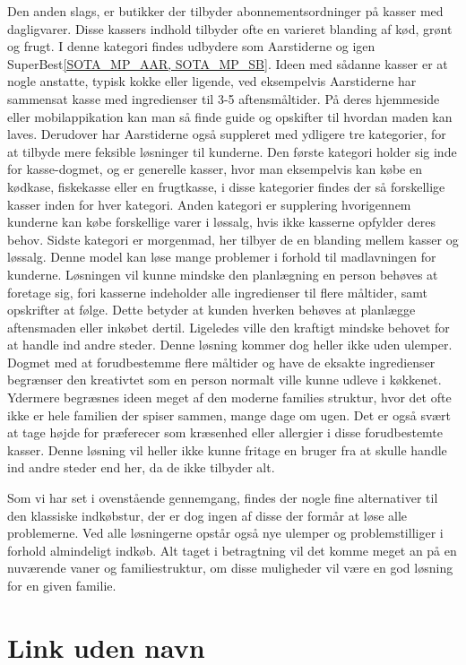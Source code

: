 Den anden slags, er butikker der tilbyder abonnementsordninger på kasser med dagligvarer.
Disse kassers indhold tilbyder ofte en varieret blanding af kød, grønt og frugt.
I denne kategori findes udbydere som Aarstiderne og igen SuperBest\ref{SOTA_MP_AAR, SOTA_MP_SB}.
Ideen med sådanne kasser er at nogle anstatte, typisk kokke eller ligende, ved eksempelvis Aarstiderne har sammensat kasse med ingredienser til 3-5 aftensmåltider.
På deres hjemmeside eller mobilappikation kan man så finde guide og opskifter til hvordan maden kan laves.
Derudover har Aarstiderne også suppleret med ydligere tre kategorier, for at tilbyde mere feksible løsninger til kunderne.
Den første kategori holder sig inde for kasse-dogmet, og er generelle kasser, hvor man eksempelvis kan købe en kødkase, fiskekasse eller en frugtkasse, i disse kategorier findes der så forskellige kasser inden for hver kategori.
Anden kategori er supplering hvorigennem kunderne kan købe forskellige varer i løssalg, hvis ikke kasserne opfylder deres behov.
Sidste kategori er morgenmad, her tilbyer de en blanding mellem kasser og løssalg.
Denne model kan løse mange problemer i forhold til madlavningen for kunderne.
Løsningen vil kunne mindske den planlægning en person behøves at foretage sig, fori kasserne indeholder alle ingredienser til flere måltider, samt opskrifter at følge.
Dette betyder at kunden  hverken behøves at planlægge aftensmaden eller inkøbet dertil.
Ligeledes ville den kraftigt mindske behovet for at handle ind andre steder.
Denne løsning kommer dog heller ikke uden ulemper.
Dogmet med at forudbestemme flere måltider og have de eksakte ingredienser begrænser den kreativtet som en person normalt ville kunne udleve i køkkenet.
Ydermere begræsnes ideen meget af den moderne families struktur, hvor det ofte ikke er hele familien der spiser sammen, mange dage om ugen.
Det er også svært at tage højde for præferecer som kræsenhed eller allergier i disse forudbestemte kasser.
Denne løsning vil heller ikke kunne fritage en bruger fra at skulle handle ind andre steder end her, da de ikke tilbyder alt.


Som vi har set i ovenstående gennemgang, findes der nogle fine alternativer til den klassiske indkøbstur, der er dog ingen af disse der formår at løse alle problemerne.
Ved alle løsningerne opstår også nye ulemper og problemstilliger i forhold almindeligt indkøb.
Alt taget i betragtning vil det komme meget an på en nuværende vaner og familiestruktur, om disse muligheder vil være en god løsning for en given familie.


\section{Link uden navn}